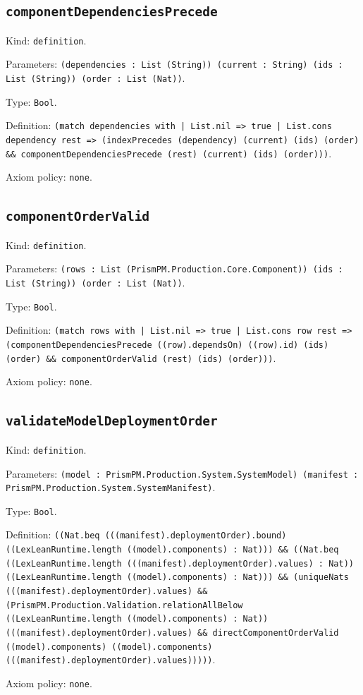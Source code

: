 \documentclass[11pt]{article}
\begin{document}
\subsection*{\texttt{componentDependenciesPrecede}}
\noindent Kind: \texttt{definition}.\par
\noindent Parameters: \texttt{(dependencies : List (String)) (current : String) (ids : List (String)) (order : List (Nat))}.\par
\noindent Type: \texttt{Bool}.\par
\noindent Definition: \texttt{(match dependencies with | List.nil => true | List.cons dependency rest => (indexPrecedes (dependency) (current) (ids) (order) \&\& componentDependenciesPrecede (rest) (current) (ids) (order)))}.\par
\noindent Axiom policy: \texttt{none}.\par
\subsection*{\texttt{componentOrderValid}}
\noindent Kind: \texttt{definition}.\par
\noindent Parameters: \texttt{(rows : List (PrismPM.Production.Core.Component)) (ids : List (String)) (order : List (Nat))}.\par
\noindent Type: \texttt{Bool}.\par
\noindent Definition: \texttt{(match rows with | List.nil => true | List.cons row rest => (componentDependenciesPrecede ((row).dependsOn) ((row).id) (ids) (order) \&\& componentOrderValid (rest) (ids) (order)))}.\par
\noindent Axiom policy: \texttt{none}.\par
\subsection*{\texttt{validateModelDeploymentOrder}}
\noindent Kind: \texttt{definition}.\par
\noindent Parameters: \texttt{(model : PrismPM.Production.System.SystemModel) (manifest : PrismPM.Production.System.SystemManifest)}.\par
\noindent Type: \texttt{Bool}.\par
\noindent Definition: \texttt{((Nat.beq (((manifest).deploymentOrder).bound) ((LexLeanRuntime.length ((model).components) : Nat))) \&\& ((Nat.beq ((LexLeanRuntime.length (((manifest).deploymentOrder).values) : Nat)) ((LexLeanRuntime.length ((model).components) : Nat))) \&\& (uniqueNats (((manifest).deploymentOrder).values) \&\& (PrismPM.Production.Validation.relationAllBelow ((LexLeanRuntime.length ((model).components) : Nat)) (((manifest).deploymentOrder).values) \&\& directComponentOrderValid ((model).components) ((model).components) (((manifest).deploymentOrder).values)))))}.\par
\noindent Axiom policy: \texttt{none}.\par
\end{document}
